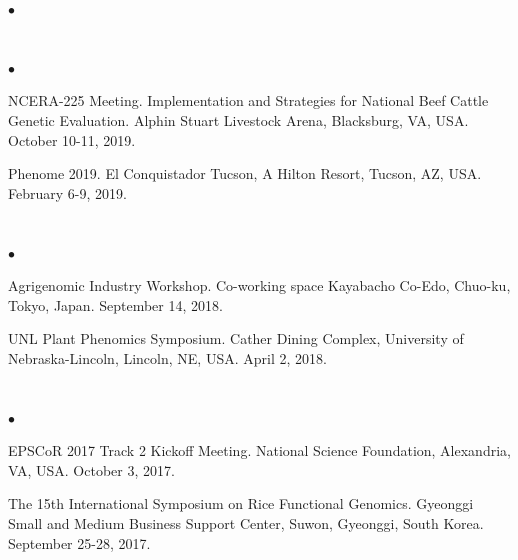 \documentclass[margin,line,10pt]{res}
\newenvironment{list2}{
  \begin{list}{$\bullet$}{%
      \setlength{\itemsep}{0in}
      \setlength{\parsep}{0in} \setlength{\parskip}{0in}
      \setlength{\topsep}{0in} \setlength{\partopsep}{0in} 
      \setlength{\leftmargin}{0.2in}}}{\end{list}}
\begin{document}
\begin{resume}
\begin{list2}
\end{list2}



\section{}
\begin{list2}

\item NCERA-225 Meeting. Implementation and Strategies for National Beef Cattle Genetic Evaluation. Alphin Stuart Livestock Arena, Blacksburg, VA, USA. October 10-11, 2019.

  \vspace{0.5cm}

\item Phenome 2019. El Conquistador Tucson, A Hilton Resort, Tucson, AZ, USA. February 6-9, 2019.

\end{list2}




\section{}
\begin{list2}

  \item Agrigenomic Industry Workshop. Co-working space Kayabacho Co-Edo, Chuo-ku, Tokyo, Japan. September 14, 2018.

    \vspace{0.5cm}
    
\item UNL Plant Phenomics Symposium. Cather Dining Complex, University of Nebraska-Lincoln, Lincoln, NE, USA. April 2, 2018.

\end{list2}


\section{}
\begin{list2}

\item EPSCoR 2017 Track 2 Kickoff Meeting.  National Science Foundation, Alexandria, VA, USA. October 3, 2017.
  
  \vspace{0.5cm}

\item The 15th International Symposium on Rice Functional Genomics. Gyeonggi Small and Medium Business Support Center, Suwon, Gyeonggi, South Korea. September 25-28, 2017.


\end{list2}
\end{resume}
\end{document}
